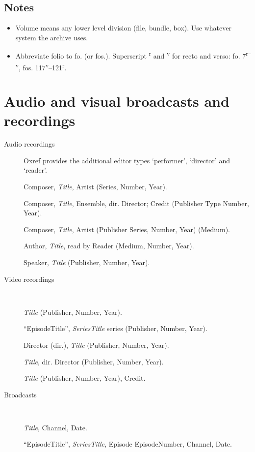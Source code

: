 \documentclass[extrafontsizes,11pt,a4paper,oneside]{memoir}
\newcommand*{\lit}[1]{\textsf{#1}}
\newcommand*{\code}[1]{`\textsf{#1}'}
\begin{document}
\subsection{Notes}
\begin{itemize}
  \item Volume means any lower level division (file, bundle, box). Use whatever system the archive uses.
  \item Abbreviate folio to fo. (or fos.). Superscript \textsuperscript{r} and \textsuperscript{v} for recto and verso: fo. 7\textsuperscript{r--v}, fos. 117\textsuperscript{v}--121\textsuperscript{r}.
\end{itemize}

\section{Audio and visual broadcasts and recordings}\label{sec:audiovideo}

\begin{description}
  \item[Audio recordings] Oxref provides the additional editor types \code{performer}, \code{director} and \code{reader}.
  \par Composer, \emph{Title}, Artist (Series, Number, Year).
  \\
  \par Composer, \emph{Title}, Ensemble, \lit{dir.} Director; Credit (Publisher Type Number, Year).
  \\
  \par Composer, \emph{Title}, Artist (Publisher Series, Number, Year) (Medium).
  \\
  \par Author, \emph{Title}, \lit{read by} Reader (Medium, Number, Year).
  \\
  \par Speaker, \emph{Title} (Publisher, Number, Year).
  \item[Video recordings]~
  \par \emph{Title} (Publisher, Number, Year).
  \par \enquote{EpisodeTitle}, \emph{SeriesTitle} \lit{series} (Publisher, Number, Year).
  \par Director (\lit{dir.}), \emph{Title} (Publisher, Number, Year).
  \par \emph{Title}, \lit{dir.} Director (Publisher, Number, Year).
  \par \emph{Title} (Publisher, Number, Year), Credit.
  \item[Broadcasts]~
  \par \emph{Title}, Channel, Date.
  \par \enquote{EpisodeTitle}, \emph{SeriesTitle}, \lit{Episode} EpisodeNumber, Channel, Date.
\end{description}
\end{document}
